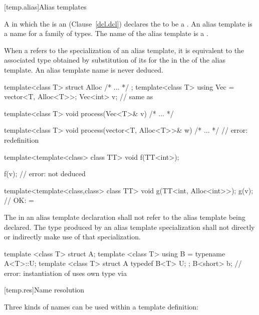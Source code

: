 [temp.alias]{Alias templates}

\pnum
A  in which the  is an
 (Clause~\ref{dcl.dcl}) declares the
 to be a .
An alias template is a name for a family of
types. The name of the alias template is a .

\pnum
When a  refers to the specialization of
an alias template, it is equivalent to the associated type obtained by
substitution of its  for the
 in the  of
the alias template.
\enternote An alias template name is never deduced.\exitnote
\enterexample

\begin{codeblock}
template<class T> struct Alloc { /* ... */ };
template<class T> using Vec = vector<T, Alloc<T>>;
Vec<int> v;         // same as 

template<class T>
  void process(Vec<T>& v)
  { /* ... */ }

template<class T>
  void process(vector<T, Alloc<T>>& w)
  { /* ... */ }     // error: redefinition

template<template<class> class TT>
  void f(TT<int>);

f(v);               // error:  not deduced

template<template<class,class> class TT>
  void g(TT<int, Alloc<int>>);
g(v);               // OK:  = 
\end{codeblock}

\exitexample

\pnum
The  in an alias template declaration shall not refer to
the alias template being declared. The type produced by an alias template
specialization shall not directly or indirectly make use of that specialization.
\enterexample

\begin{codeblock}
template <class T> struct A;
template <class T> using B = typename A<T>::U;
template <class T> struct A {
  typedef B<T> U;
};
B<short> b;         // error: instantiation of  uses own type via 
\end{codeblock}
\exitexample

[temp.res]{Name resolution}

\pnum
{}%
%
Three kinds of names can be used within a template definition:

